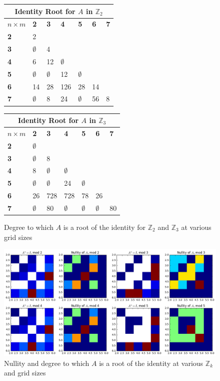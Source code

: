 \documentclass[11pt]{article}
\newcommand{\na}{$\emptyset$}
\newcommand{\modZ}[1]{$\mathbb{Z}_{#1}$}
\begin{document}
\begin{figure}
  \caption{Degree to which $A$ is a root of the identity for \modZ{2} and \modZ{3} at various grid sizes}
  \label{cycles-table}
  \begin{center}
  \begin{tabular}{|l|l|l|l|l|l|l|}
    \hline
    \multicolumn{7}{|c|}{Identity Root for $A$ in $\mathbb{Z}_2$} \\ \hline
    $n\times m$&\textbf{2}&\textbf{3}&\textbf{4}&\textbf{5}&\textbf{6}&\textbf{7}\\ \hline
    \textbf{2} & 2   & & & & & \\ \hline
    \textbf{3} & \na & 4   & & & & \\ \hline
    \textbf{4} & 6   & 12  & \na & & & \\ \hline
    \textbf{5} & \na & \na & 12  & \na & & \\ \hline
    \textbf{6} & 14  & 28  & 126 & 28  & 14 & \\ \hline
    \textbf{7} & \na & 8   & 24  & \na & 56 & 8 \\ \hline
  \end{tabular} \begin{tabular}{|l|l|l|l|l|l|l|}
    \hline
    \multicolumn{7}{|c|}{Identity Root for $A$ in $\mathbb{Z}_3$} \\ \hline
    $n\times m$&\textbf{2}&\textbf{3}&\textbf{4}&\textbf{5}&\textbf{6}&\textbf{7}\\ \hline
    \textbf{2} & \na & & & & & \\ \hline
    \textbf{3} & \na & 8   & & & & \\ \hline
    \textbf{4} & 8   & \na & \na & & & \\ \hline
    \textbf{5} & \na & \na & 24  & \na & & \\ \hline
    \textbf{6} & 26  & 728 & 728 & 78  & 26  & \\ \hline
    \textbf{7} & \na & 80  & \na  & \na & \na & 80 \\ \hline
  \end{tabular}
  \end{center}
\end{figure}

\begin{figure}
  \caption{Nullity and degree to which $A$ is a root of the identity at various $\mathbb{Z}_k$ and grid sizes}
  \label{cycles-vs-null}
  \includegraphics[width=\textwidth]{cycles-vs-nullity-small.png}
\end{figure}
\end{document}
